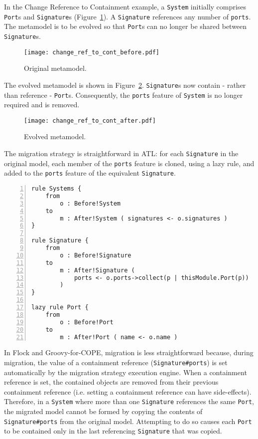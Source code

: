In the Change Reference to Containment example, a \texttt{System} initially comprises \texttt{Port}s and \texttt{Signature}s (Figure~\ref{fig:ref2cont_original_mm}). A \texttt{Signature} references any number of \texttt{ports}. The metamodel is to be evolved so that \texttt{Port}s can no longer be shared between \texttt{Signature}s.

\begin{figure}[htbp]
  \centering
  \texttt{[image: change\_ref\_to\_cont\_before.pdf]}
  \caption{Original metamodel.}
  \label{fig:ref2cont_original_mm}
\end{figure}

The evolved metamodel is shown in Figure~\ref{fig:ref2cont_evolved_mm}. \texttt{Signature}s now contain - rather than reference - \texttt{Port}s. Consequently, the \texttt{ports} feature of \texttt{System} is no longer required and is removed.

\begin{figure}[htbp]
  \centering
  \texttt{[image: change\_ref\_to\_cont\_after.pdf]}
  \caption{Evolved metamodel.}
  \label{fig:ref2cont_evolved_mm}
\end{figure}

The migration strategy is straightforward in ATL: for each \texttt{Signature} in the original model, each member of the \texttt{ports} feature is cloned, using a lazy rule, and added to the \texttt{ports} feature of the equivalent \texttt{Signature}.

\begin{lstlisting}[basicstyle=\ttfamily\footnotesize, flexiblecolumns=true, numbers=left, nolol=true, caption=Change R to C model migration in ATL, label=lst:ref2cont_atl, language=ATL, tabsize=2]
rule Systems {
	from
		o : Before!System
	to
		m : After!System ( signatures <- o.signatures )
}

rule Signature {
	from
		o : Before!Signature
	to
		m : After!Signature (
			ports <- o.ports->collect(p | thisModule.Port(p))
		)
}

lazy rule Port {
	from
		o : Before!Port
	to
		m : After!Port ( name <- o.name )
\end{lstlisting}

In Flock and Groovy-for-COPE, migration is less straightforward because, during migration, the value of a containment reference (\texttt{Signature\#ports}) is set automatically by the migration strategy execution engine. When a containment reference is set, the contained objects are removed from their previous containment reference (i.e. setting a containment reference can have side-effects). Therefore, in a \texttt{System} where more than one \texttt{Signature} references the same \texttt{Port}, the migrated model cannot be formed by copying the contents of \texttt{Signature\#ports} from the original model. Attempting to do so causes each \texttt{Port} to be contained only in the last referencing \texttt{Signature} that was copied.

